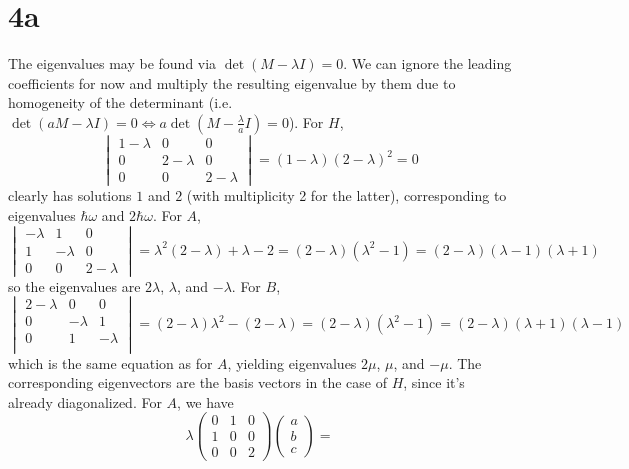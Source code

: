 \documentclass{article}
\begin{document}
\section*{4a}
The eigenvalues may be found via $\det(M-\lambda I)=0$.
We can ignore the leading coefficients for now and multiply the resulting eigenvalue by them due to homogeneity of the determinant
(i.e. $\det(aM-\lambda I)=0\Leftrightarrow a\det(M-\frac{\lambda}{a}I)=0$).
For $H$,
\[
  \begin{vmatrix}
    1-\lambda & 0 & 0 \\
    0 & 2-\lambda & 0 \\
    0 & 0 & 2-\lambda
  \end{vmatrix}
  =(1-\lambda)(2-\lambda)^{2}
  =0
\]
clearly has solutions $1$ and $2$ (with multiplicity 2 for the latter), corresponding to eigenvalues $\hbar\omega$ and $2\hbar\omega$.
For $A$,
\[
  \begin{vmatrix}
    -\lambda & 1 & 0 \\
    1 & -\lambda & 0 \\
    0 & 0 & 2-\lambda
  \end{vmatrix}
  =\lambda^{2}(2-\lambda)+\lambda-2
  =(2-\lambda)(\lambda^{2}-1)=(2-\lambda)(\lambda-1)(\lambda+1)
\]
so the eigenvalues are $2\lambda$, $\lambda$, and $-\lambda$.
For $B$,
\[
  \begin{vmatrix}
    2-\lambda & 0 & 0 \\
    0 & -\lambda & 1 \\
    0 & 1 & -\lambda \\
  \end{vmatrix}
  =(2-\lambda)\lambda^{2}-(2-\lambda)
  =(2-\lambda)(\lambda^{2}-1)
  =(2-\lambda)(\lambda+1)(\lambda-1)
\]
which is the same equation as for $A$, yielding eigenvalues $2\mu$, $\mu$, and $-\mu$.
The corresponding eigenvectors are the basis vectors in the case of $H$, since it's already diagonalized.
For $A$, we have
\[
  \lambda
  \begin{pmatrix}
    0 & 1 & 0 \\
    1 & 0 & 0 \\
    0 & 0 & 2
  \end{pmatrix}
  \begin{pmatrix}
    a \\
    b \\
    c
  \end{pmatrix}
  =
\]
\end{document}
